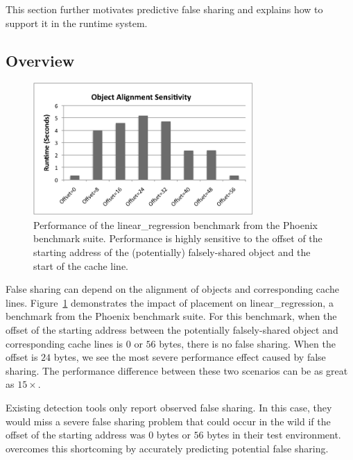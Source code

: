 \label{sec:prediction}
This section further motivates predictive false sharing and explains how to support it in the runtime system.  

\subsection{Overview}
\label{sec:predictoverview}

\begin{figure}[!t]
\begin{center}
\includegraphics[width=3.3in]{fig/perfsensitive}
\end{center}
\caption{
Performance of the linear\_regression benchmark from the Phoenix benchmark suite.
Performance is highly sensitive to the offset of the starting address of the (potentially) falsely-shared object 
and the start of the cache line. 
\label{fig:perfsensitive}}
\end{figure}

False sharing can depend on 
the alignment of objects and corresponding cache lines.
Figure~\ref{fig:perfsensitive} demonstrates the impact of placement on linear\_regression, a benchmark from the Phoenix benchmark suite.
For this benchmark,
when the offset of the starting address between the potentially falsely-shared object and corresponding cache lines 
is $0$ or $56$ bytes, 
there is no false sharing. 
When the offset is $24$ bytes, we see the most severe performance effect caused 
by false sharing. 
The performance difference between these two scenarios can be as great as $15\times$.
 
Existing detection tools only report observed false sharing.
In this case, they would miss a severe false sharing problem that could occur in the wild if the offset of the starting 
address was $0$ bytes or $56$ bytes in their test environment.
\Predator{} overcomes this shortcoming by accurately predicting potential false sharing.

